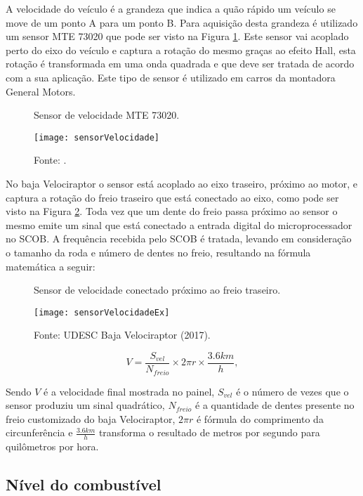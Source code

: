 A velocidade do veículo é a grandeza que indica a quão rápido um veículo se move de um ponto A para um ponto B. Para aquisição desta grandeza é utilizado um sensor MTE 73020 que pode ser visto na Figura \ref{fig:sensorVelocidade}. Este sensor vai acoplado perto do eixo do veículo e captura a rotação do mesmo graças ao efeito Hall, esta rotação é transformada em uma onda quadrada \cite{MTEsensorVelocidade} e que deve ser tratada de acordo com a sua aplicação. Este tipo de sensor é utilizado em carros da montadora General Motors.  

\begin{figure}[!htb]
	\centering
		\caption{Sensor de velocidade MTE 73020.}
		\texttt{[image: sensorVelocidade]} 
		\caption*{Fonte: \cite{MTEsensorVelocidade}.}
		\label{fig:sensorVelocidade}
\end{figure} 

No baja Velociraptor o sensor está acoplado ao eixo traseiro, próximo ao motor, e captura a rotação do freio traseiro que está conectado ao eixo, como pode ser visto na Figura \ref{fig:sensorVelocidadeEx}. Toda vez que um dente do freio passa próximo ao sensor o mesmo emite um sinal que está conectado a entrada digital do microprocessador no SCOB. A frequência recebida pelo SCOB é tratada, levando em consideração o tamanho da roda e número de dentes no freio, resultando na fórmula matemática a seguir:

\begin{figure}[!htb]
	\centering
		\caption{Sensor de velocidade conectado próximo ao freio traseiro.}
		\texttt{[image: sensorVelocidadeEx]} 
		\caption*{Fonte: UDESC Baja Velociraptor (2017).}
		\label{fig:sensorVelocidadeEx}
\end{figure} 

	$$V = \frac{S_{vel}}{N_{freio}} \times 2 \pi r  \times \frac{3.6km}{h},$$  

Sendo $V$ é a velocidade final mostrada no painel, $S_{vel}$ é o número de vezes que o sensor produziu um sinal quadrático, $N_{freio}$ é a quantidade de dentes presente no freio customizado do baja Velociraptor, $2 \pi r$ é fórmula do comprimento da circunferência e $\frac{3.6km}{h}$ transforma o resultado de metros por segundo para quilômetros por hora.

\subsection{Nível do combustível}
\label{subsec:combustivel}

